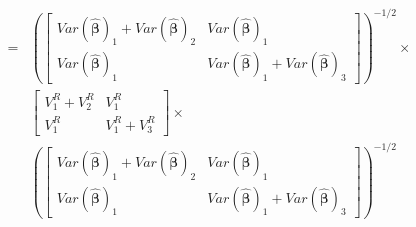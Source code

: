   \begin{equation}
    \begin{split}
       = & \left(\begin{bmatrix}
        Var(\mathbf{\hat{\beta}})_1 + Var(\mathbf{\hat{\beta}})_2 & Var(\mathbf{\hat{\beta}})_1 \\
        Var(\mathbf{\hat{\beta}})_1 & Var(\mathbf{\hat{\beta}})_1+Var(\mathbf{\hat{\beta}})_3
    \end{bmatrix} \right)^{-1/2} \times \\
     &
    \begin{bmatrix}
        V^R_1 + V^R_2 & V^R_1 \\
        V^R_1 & V^R_1+V^R_3
    \end{bmatrix}
      \times \\
     &\left(\begin{bmatrix}
        Var(\mathbf{\hat{\beta}})_1 + Var(\mathbf{\hat{\beta}})_2 & Var(\mathbf{\hat{\beta}})_1 \\
        Var(\mathbf{\hat{\beta}})_1 & Var(\mathbf{\hat{\beta}})_1+Var(\mathbf{\hat{\beta}})_3
    \end{bmatrix} \right)^{-1/2} \\ 
    \end{split}
 \end{equation}


